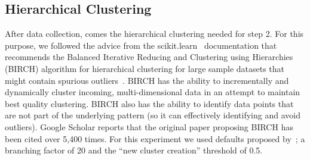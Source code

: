 \documentclass[10pt,journal,compsoc]{IEEEtran}
\begin{document}
\subsection{Hierarchical Clustering}\label{sec:hc}

 After data collection, comes  the  hierarchical clustering needed for step 2.
For this purpose, we followed the
advice from the scikit.learn~\cite{scikit-learn} documentation
that recommends the  Balanced Iterative Reducing and Clustering using Hierarchies  (BIRCH) algorithm for hierarchical
clustering for large sample datasets that might
contain spurious outliers~\cite{zhang1996birch}. 
BIRCH has the ability to incrementally and dynamically cluster incoming, multi-dimensional data in an attempt to maintain  best quality clustering. BIRCH also has the ability to identify data points that are not part of the underlying pattern (so it can effectively identifying and avoid outliers). 
 Google Scholar reports that  the original  paper proposing BIRCH has been cited over 5,400 times.
For this experiment we used defaults proposed by~\cite{zhang1996birch}; a   branching factor of 20 and  the ``new cluster creation'' threshold  of  0.5.

 
\end{document}
